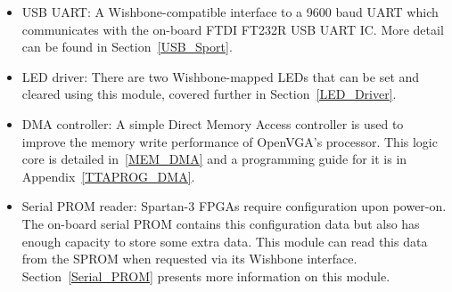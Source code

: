 \begin{itemize}
  \item USB UART: A Wishbone-compatible interface to a 9600 baud UART which
  communicates with the on-board FTDI FT232R USB UART IC. More detail can be
  found in Section~\ref{USB_Sport}.
  \item LED driver: There are two Wishbone-mapped LEDs that can be set and
  cleared using this module, covered further in Section~\ref{LED_Driver}.
  \item DMA controller: A simple Direct Memory Access controller is used to
  improve the memory write performance of OpenVGA's processor. This logic core
  is detailed in~\ref{MEM_DMA} and a programming guide for it is in
  Appendix~\ref{TTAPROG_DMA}.
  \item Serial PROM reader: Spartan-3 FPGAs require configuration upon
  power-on. The on-board serial PROM contains this configuration data but also
  has enough capacity to store some extra data. This module can read this data
  from the SPROM when requested via its Wishbone interface.
  Section~\ref{Serial_PROM} presents more information on this module.
\end{itemize}
